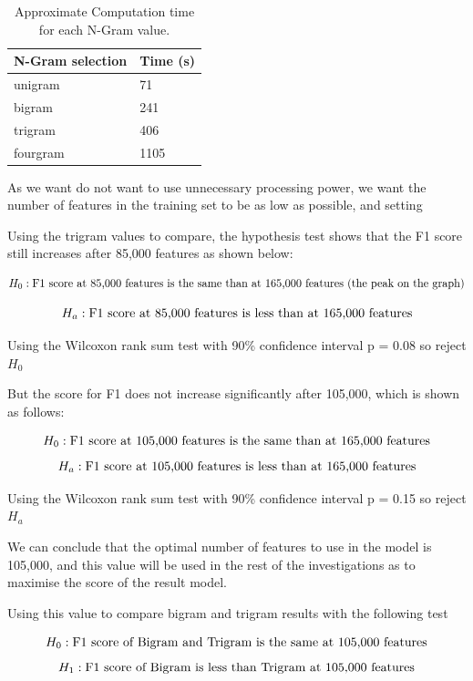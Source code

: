 \begin{table}
\centering
\label{ngram:time}
\caption{Approximate Computation time for each N-Gram value.}
\begin{tabular}{ |p{3cm}|p{3cm}|}
 \hline
  N-Gram selection & Time (s) \\
 \hline
  unigram & 71\\
  bigram & 241\\
  trigram & 406\\
  fourgram & 1105 \\
 \hline
\end{tabular}

\end{table}


As we want do not want to use unnecessary processing power, we want the number of features in the training set to be as low as possible, and setting 


Using the trigram values to compare, the hypothesis test shows that the F1 score still increases after 85,000 features as shown below:

$$ H_0:  \textnormal{F1 score at 85,000 features is the same than at 165,000 features (the peak on the graph)}$$

$$ H_a: \textnormal{F1 score at 85,000 features is less than at 165,000 features} $$

Using the Wilcoxon rank sum test with 90\% confidence interval 
p = 0.08 so reject $H_0$

But the score for F1 does not increase significantly after 105,000, which is shown as follows:

$$H_0: \textnormal{F1 score at 105,000 features is the same than at 165,000 features} $$
$$H_a: \textnormal{F1 score at 105,000 features is less than at 165,000 features}$$

Using the Wilcoxon rank sum test with 90\% confidence interval 
p = 0.15 so reject $H_a$


We can conclude that the optimal number of features to use in the model is 105,000, and this value will be used in the rest of the investigations as to maximise the score of the result model.



Using this value to compare bigram and trigram results with the following test 

$$ H_0: \textnormal{F1 score of Bigram and Trigram is the same at 105,000 features} $$
$$ H_1: \textnormal{F1 score of Bigram is less than Trigram at 105,000 features} $$

